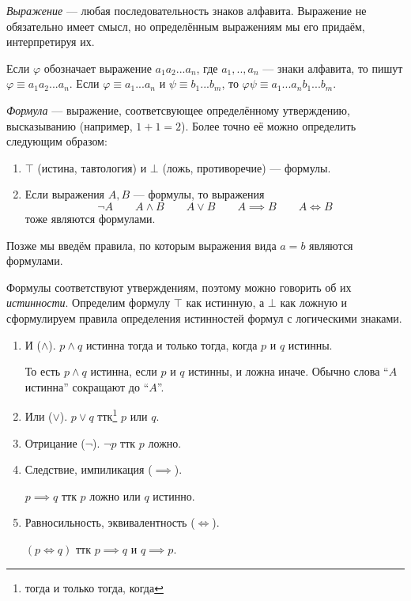 {\it Выражение} --- любая последовательность знаков алфавита.
Выражение не обязательно имеет смысл, но определённым выражениям мы его придаём,
интерпретируя их.

Если $\varphi$ обозначает выражение $a_1a_2...a_{n}$,
где $a_1,..,a_{n}$ --- знаки алфавита, то пишут ${\varphi\equiv a_1a_2...a_{n}}$.
Если ${\varphi\equiv a_1...a_{n}}$ и ${\psi\equiv b_1...b_{m}}$,
то $\varphi\psi\equiv a_1...a_{n}b_1...b_{m}$.


{\it Формула} --- выражение, соответсвующее определённому утверждению, высказыванию
(например, $1+1=2$). Более точно её можно определить следующим образом:
\begin{enumerate}
	\item{}$\top$ (истина, тавтология) и $\bot$ (ложь, противоречие) --- формулы.
	\item{}Если выражения $A,B$ --- формулы, то выражения
		\[
			\lnot A\qquad A\land B\qquad A\lor B\qquad A\implies B\qquad A\iff B
		\]
		тоже являются формулами.
\end{enumerate}
Позже мы введём правила, по которым выражения
вида ${a=b}$ являются формулами.

Формулы соответствуют утверждениям, поэтому можно говорить об их {\it истинности}.
Определим формулу $\top$ как истинную, а $\bot$ как ложную и
сформулируем правила определения истинностей формул с логическими знаками.
\begin{enumerate}
	\item{}И ($\land$). $p\land q$ истинна тогда и только тогда, когда $p$ и $q$ истинны.

		То есть $p\land q$ истинна, если $p$ и $q$ истинны,
		и ложна иначе. Обычно слова ``$A$ истинна'' сокращают до ``$A$''.

	\item{}Или ($\lor$). $p\lor q$ ттк\footnote{тогда и только тогда, когда} $p$ или $q$.

	\item{}Отрицание ($\lnot$). $\lnot p$ ттк $p$ ложно.

	\item{}Следствие, импиликация ($\implies$).

		$p\implies q$ ттк $p$ ложно или $q$ истинно.

	\item{}Равносильность, эквивалентность ($\iff$).

		$(p\iff q)$ ттк $p\implies q$ и $q\implies p$.
\end{enumerate}

